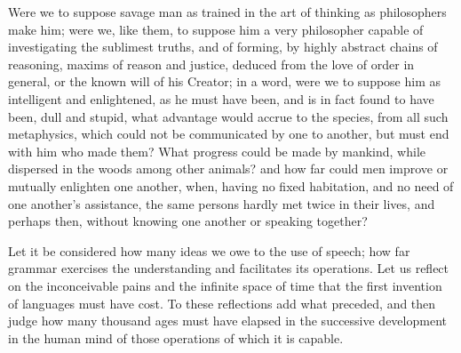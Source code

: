 \documentclass[12pt]{report}
\begin{document}
Were we to suppose savage man as trained in the art of thinking as philosophers make him; were we, like them, to suppose him a very philosopher capable of investigating the sublimest truths, and of forming, by highly abstract chains of reasoning, maxims of reason and justice, deduced from the love of order in general, or the known will of his Creator; in a word, were we to suppose him as intelligent and enlightened, as he must have been, and is in fact found to have been, dull and stupid, what advantage would accrue to the species, from all such metaphysics, which could not be communicated by one to another, but must end with him who made them? What progress could be made by mankind, while dispersed in the woods among other animals? and how far could men improve or mutually enlighten one another, when, having no fixed habitation, and no need of one another's assistance, the same persons hardly met twice in their lives, and perhaps then, without knowing one another or speaking together?

Let it be considered how many ideas we owe to the use of speech; how far grammar exercises the understanding and facilitates its operations. Let us reflect on the inconceivable pains and the infinite space of time that the first invention of languages must have cost. To these reflections add what preceded, and then judge how many thousand ages must have elapsed in the successive development in the human mind of those operations of which it is capable.
\end{document}
